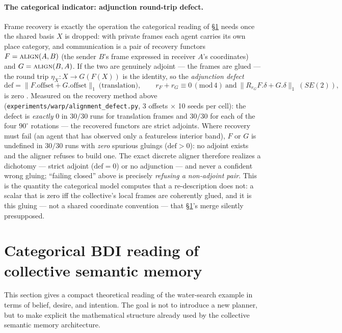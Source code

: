 \documentclass{article}
\begin{document}
\paragraph{The categorical indicator: adjunction round-trip defect.}
Frame recovery is exactly the operation the categorical reading of
\S\ref{sec:categorical} needs once the shared basis $X$ is dropped: with
private frames each agent carries its own place category, and
communication is a pair of recovery functors $F=\textsc{align}(A,B)$
(the sender $B$'s frame expressed in receiver $A$'s coordinates) and
$G=\textsc{align}(B,A)$. If the two are genuinely adjoint --- the frames
are glued --- the round trip $\eta_X: X\to G(F(X))$ is the identity, so
the \emph{adjunction defect}
\[
\mathrm{def}=\lVert F.\mathrm{offset}+G.\mathrm{offset}\rVert_1
\ \text{(translation)},\qquad
r_F{+}r_G\equiv 0\,(\mathrm{mod}\,4)\ \text{and}\
\lVert R_{r_G}F.\delta+G.\delta\rVert_1\ (SE(2)),
\]
is zero \citep{maclane1998categories}. Measured on the recovery method
above (\texttt{experiments/warp/alignment\_defect.py}, 3 offsets
$\times$ 10 seeds per cell): the defect is \emph{exactly} $0$ in $30/30$
runs for translation frames and $30/30$ for each of the four $90^\circ$
rotations --- the recovered functors are strict adjoints. Where recovery
must fail (an agent that has observed only a featureless interior band),
$F$ or $G$ is undefined in $30/30$ runs with \emph{zero} spurious
gluings ($\mathrm{def}>0$): no adjoint exists and the aligner refuses to
build one. The exact discrete aligner therefore realizes a dichotomy ---
strict adjoint ($\mathrm{def}{=}0$) or no adjunction --- and never a
confident wrong gluing; ``failing closed'' above is precisely
\emph{refusing a non-adjoint pair}. This is the quantity the categorical
model computes that a re-description does not: a scalar that is zero iff
the collective's local frames are coherently glued, and it is this
gluing --- not a shared coordinate convention --- that
\S\ref{sec:categorical}'s merge silently presupposed.

\section{Categorical BDI reading of collective semantic memory}
\label{sec:categorical}

This section gives a compact theoretical reading of the water-search
example in terms of belief, desire, and intention. The goal is not to
introduce a new planner, but to make explicit the mathematical
structure already used by the collective semantic memory architecture.
\end{document}

